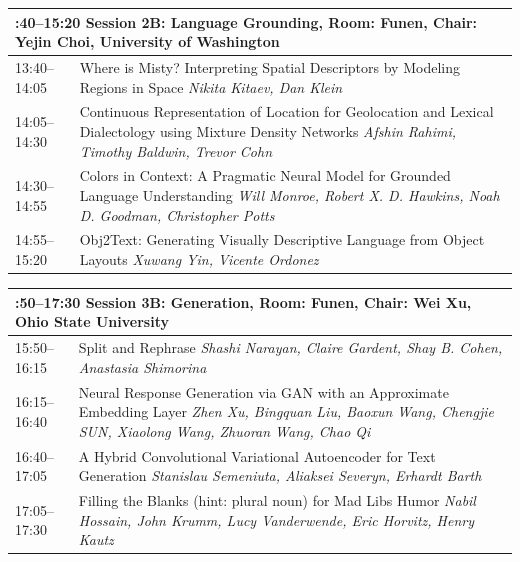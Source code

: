 \documentclass{book}
\renewcommand{\large}{\fontsize{36}{40}\selectfont}
\begin{document}
\begin{tabular}{p{3in}p{16in}}
  \multicolumn{2}{p{\textwidth}}{\bfseries\large 13:40--15:20 Session 2B: Language Grounding, Room:  Funen, Chair:  Yejin Choi, University of Washington} \\\hline

    
    13:40--14:05
    &	Where is Misty? Interpreting Spatial Descriptors by Modeling Regions in Space \newline 
    {\itshape Nikita Kitaev, Dan Klein} \\
    
    14:05--14:30
    &	Continuous Representation of Location for Geolocation and Lexical Dialectology using Mixture Density Networks \newline 
    {\itshape Afshin Rahimi, Timothy Baldwin, Trevor Cohn} \\
    
    14:30--14:55
    &	Colors in Context: A Pragmatic Neural Model for Grounded Language Understanding \newline 
    {\itshape Will Monroe, Robert X. D. Hawkins, Noah D. Goodman, Christopher Potts} \\
    
    14:55--15:20
    &	Obj2Text: Generating Visually Descriptive Language from Object Layouts \newline 
    {\itshape Xuwang Yin, Vicente Ordonez} \\
    
\end{tabular}

\begin{tabular}{p{3in}p{16in}}
  \multicolumn{2}{p{\textwidth}}{\bfseries\large 15:50--17:30 Session 3B: Generation, Room:  Funen, Chair:  Wei Xu, Ohio State University} \\\hline

    
    15:50--16:15
    &	Split and Rephrase \newline 
    {\itshape Shashi Narayan, Claire Gardent, Shay B. Cohen, Anastasia Shimorina} \\
    
    16:15--16:40
    &	Neural Response Generation via GAN with an Approximate Embedding Layer \newline 
    {\itshape Zhen Xu, Bingquan Liu, Baoxun Wang, Chengjie SUN, Xiaolong Wang, Zhuoran Wang, Chao Qi} \\
    
    16:40--17:05
    &	A Hybrid Convolutional Variational Autoencoder for Text Generation \newline 
    {\itshape Stanislau Semeniuta, Aliaksei Severyn, Erhardt Barth} \\
    
    17:05--17:30
    &	Filling the Blanks (hint: plural noun) for Mad Libs Humor \newline 
    {\itshape Nabil Hossain, John Krumm, Lucy Vanderwende, Eric Horvitz, Henry Kautz} \\
    
\end{tabular}
\end{document}
